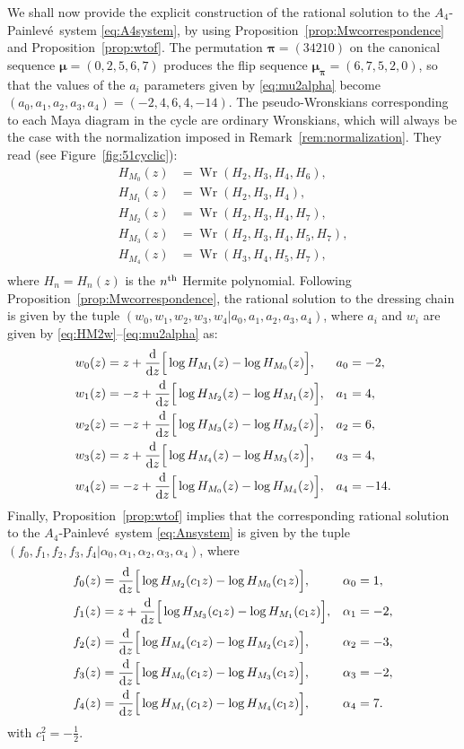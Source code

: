 \documentclass[10pt]{amsart}
\theoremstyle{definition}
\numberwithin{equation}{section}
\numberwithin{figure}{section}
\newcommand{\Wr}{\operatorname{Wr}}
\newcommand{\bmu}{{\boldsymbol{\mu}}}
\newcommand{\bpi}{{\boldsymbol{\pi}}}
\newcommand{\supth}{{}^{\rm{th}}}
\renewcommand{\H}{H}%
\newcommand{\ddz}{\frac{{\rm d}}{{\rm d}z}}
\newcommand{\p}{Painlev\'{e}}
\renewcommand{\a}{\alpha}
\newcommand{\cc}[1]{c_{#1}}
\begin{document}
We shall now provide the explicit construction of the rational solution to the $A_4$-\p\ system \eqref{eq:A4system}, by using Proposition~\ref{prop:Mwcorrespondence} and Proposition~\ref{prop:wtof}. The permutation $\bpi=(34210)$ on the canonical sequence $\bmu=(0,2,5,6,7)$ produces the flip sequence $\bmu_\bpi=(6,7,5,2,0)$, so that the values of the $a_i$ parameters given by \eqref{eq:mu2alpha} become %
$(a_0,a_1,a_2,a_3,a_4)=(-2,4,6,4,-14)$.
The pseudo-Wronskians corresponding to each Maya diagram in the cycle are ordinary Wronskians, which will always be the case with the normalization imposed in Remark~\ref{rem:normalization}. They read (see Figure~\ref{fig:51cyclic}):
\begin{align*}
\H_{M_0}(z)&=\Wr(H_2,H_3,H_4,H_6),\\
\H_{M_1}(z)&=\Wr(H_2,H_3,H_4),\\
\H_{M_2}(z)&=\Wr(H_2,H_3,H_4,H_7),\\
\H_{M_3}(z)&=\Wr(H_2,H_3,H_4,H_5,H_7),\\
\H_{M_4}(z)&=\Wr(H_3,H_4,H_5,H_7),\\
\end{align*}
where $H_n=H_n(z)$ is the $n\supth$ Hermite polynomial. Following Proposition~\ref{prop:Mwcorrespondence}, the rational solution to the dressing chain is given by the tuple $(w_0,w_1,w_2,w_3,w_4|a_0,a_1,a_2,a_3,a_4)$, where $a_i$ and $w_i$ are given by \eqref{eq:HM2w}--\eqref{eq:mu2alpha} as:
\begin{align*}
w_0(z)&=z+\ddz\Big[\log \H_{M_1}(z) - \log \H_{M_0}(z)\Big],&& a_0=-2,\\
w_1(z)&=-z+ \ddz\Big[\log \H_{M_2}(z)-\log \H_{M_1}(z)\Big],&& a_1=4,\\
w_2(z)&=-z+\ddz\Big[\log \H_{M_3}(z)- \log \H_{M_2}(z)\Big],&& a_2=6,\\
w_3(z)&=z+ \ddz\Big[\log \H_{M_4}(z) - \log \H_{M_3}(z)\Big],&& a_3=4,\\
w_4(z)&=-z+ \ddz\Big[\log \H_{M_0}(z) - \log \H_{M_4}(z)\Big],&& a_4=-14.
\end{align*}
Finally, Proposition~\ref{prop:wtof} implies that the corresponding rational solution to the $A_4$-\p\ system \eqref{eq:Ansystem} is given by the tuple $(f_0,f_1,f_2,f_3,f_4|\a_0,\a_1,\a_2,\a_3,\a_4)$, where
\begin{align*}
f_0(z)&= \ddz\Big[\log \H_{M_2}(c_1 z)- \log \H_{M_0}(c_1 z)\Big],&& \alpha_0=1,\\
f_1(z)&=z+\ddz\Big[\log \H_{M_3}(\cc{1}z) -\log \H_{M_1}(\cc{1}z)\Big],&& \alpha_1=-2,\\
f_2(z)&= \ddz\Big[\log \H_{M_4}(\cc{1}z) - \log \H_{M_2}(\cc{1}z)\Big],&& \alpha_2=-3,\\
f_3(z)&=\ddz\Big[\log \H_{M_0}(\cc{1}z) - \log \H_{M_3}(\cc{1}z)\Big],&& \alpha_3=-2,\\
f_4(z)&=\ddz\Big[\log \H_{M_1}(\cc{1}z) - \log \H_{M_4}(\cc{1}z)\Big],&& \alpha_4=7.
\end{align*}
with $\cc{1}^2=-\frac{1}{2}$.
\end{document}
